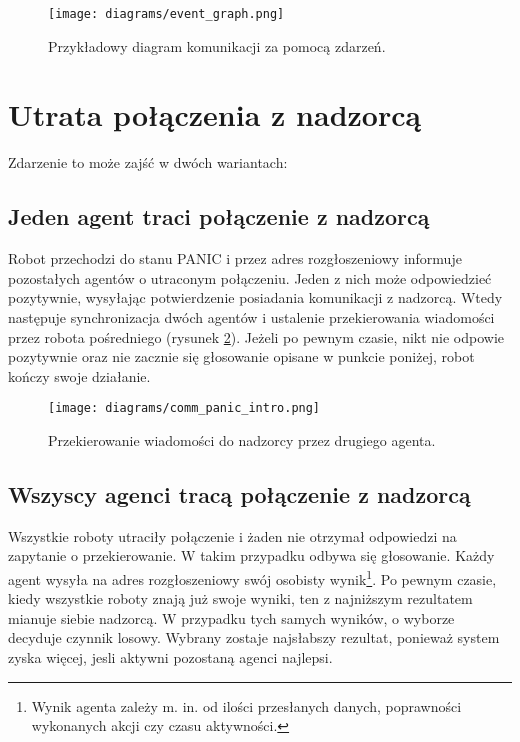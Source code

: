 \begin{figure}[!ht]
    \centering
        \texttt{[image: diagrams/event\_graph.png]}
    \caption{Przykładowy diagram komunikacji za pomocą zdarzeń.\label{fig:event_graph}}
\end{figure}

\section{Utrata połączenia z nadzorcą}
\label{sec:utrata_polaczenia}

Zdarzenie to może zajść w dwóch wariantach:

\subsection{Jeden agent traci połączenie z nadzorcą}

Robot przechodzi do stanu PANIC i przez adres rozgłoszeniowy informuje pozostałych agentów o utraconym połączeniu. Jeden z nich może odpowiedzieć pozytywnie, wysyłając potwierdzenie posiadania komunikacji z nadzorcą. Wtedy następuje synchronizacja dwóch agentów i ustalenie przekierowania wiadomości przez robota pośredniego (rysunek \ref{fig:comm_panic_intro}). Jeżeli po pewnym czasie, nikt nie odpowie pozytywnie oraz nie zacznie się głosowanie opisane w punkcie poniżej, robot kończy swoje działanie.

\begin{figure}[!ht]
    \centering
        \texttt{[image: diagrams/comm\_panic\_intro.png]}
    \caption{Przekierowanie wiadomości do nadzorcy przez drugiego agenta.\label{fig:comm_panic_intro}}
\end{figure}

\subsection{Wszyscy agenci tracą połączenie z nadzorcą}

Wszystkie roboty utraciły połączenie i żaden nie otrzymał odpowiedzi na zapytanie o przekierowanie. W takim przypadku odbywa się głosowanie. Każdy agent wysyła na adres rozgłoszeniowy swój osobisty wynik\footnote{Wynik agenta zależy m. in. od ilości przesłanych danych, poprawności wykonanych akcji czy czasu aktywności.}. Po pewnym czasie, kiedy wszystkie roboty znają już swoje wyniki, ten z najniższym rezultatem mianuje siebie nadzorcą. W przypadku tych samych wyników, o wyborze decyduje czynnik losowy. Wybrany zostaje najsłabszy rezultat, ponieważ system zyska więcej, jesli aktywni pozostaną agenci najlepsi.

